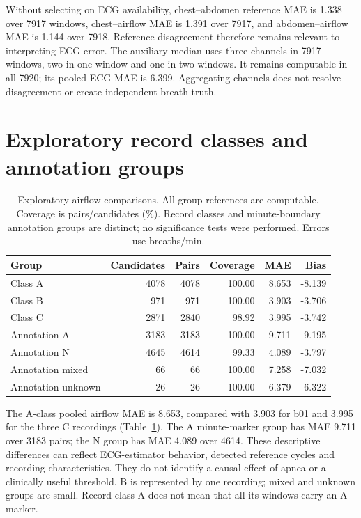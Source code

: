 Without selecting on ECG availability, chest--abdomen reference MAE is 1.338 over 7917 windows, chest--airflow MAE is 1.391 over 7917, and abdomen--airflow MAE is 1.144 over 7918. Reference disagreement therefore remains relevant to interpreting ECG error. The auxiliary median uses three channels in 7917 windows, two in one window and one in two windows. It remains computable in all 7920; its pooled ECG MAE is 6.399. Aggregating channels does not resolve disagreement or create independent breath truth.

\section{Exploratory record classes and annotation groups}

\begin{table}[htbp]
\centering\small
\caption{Exploratory airflow comparisons. All group references are computable. Coverage is pairs/candidates (\%). Record classes and minute-boundary annotation groups are distinct; no significance tests were performed. Errors use breaths/min.}
\label{tab:groups}
\begin{tabular}{@{}lrrrrr@{}}
\toprule
Group & Candidates & Pairs & Coverage & MAE & Bias \\
\midrule
Class A & 4078 & 4078 & 100.00 & 8.653 & -8.139 \\
Class B & 971 & 971 & 100.00 & 3.903 & -3.706 \\
Class C & 2871 & 2840 & 98.92 & 3.995 & -3.742 \\
Annotation A & 3183 & 3183 & 100.00 & 9.711 & -9.195 \\
Annotation N & 4645 & 4614 & 99.33 & 4.089 & -3.797 \\
Annotation mixed & 66 & 66 & 100.00 & 7.258 & -7.032 \\
Annotation unknown & 26 & 26 & 100.00 & 6.379 & -6.322 \\
\bottomrule
\end{tabular}
\end{table}

The A-class pooled airflow MAE is 8.653, compared with 3.903 for b01 and 3.995 for the three C recordings (Table~\ref{tab:groups}). The A minute-marker group has MAE 9.711 over 3183 pairs; the N group has MAE 4.089 over 4614. These descriptive differences can reflect ECG-estimator behavior, detected reference cycles and recording characteristics. They do not identify a causal effect of apnea or a clinically useful threshold. B is represented by one recording; mixed and unknown groups are small. Record class A does not mean that all its windows carry an A marker.

